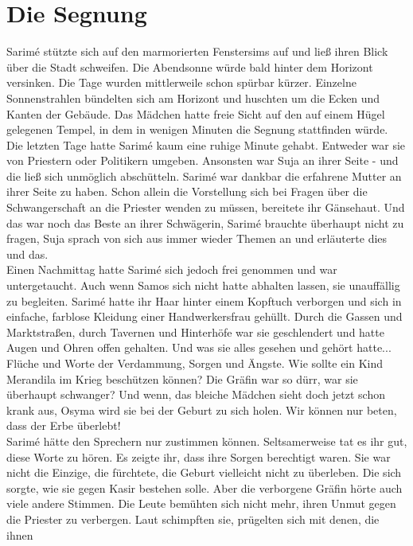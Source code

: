 \chapter{Die Segnung}

Sarimé stützte sich auf den marmorierten Fenstersims auf und ließ ihren Blick über die Stadt 
schweifen. Die Abendsonne würde bald hinter dem Horizont versinken. Die Tage wurden mittlerweile 
schon spürbar kürzer. Einzelne Sonnenstrahlen bündelten sich am Horizont und huschten um die Ecken 
und Kanten der Gebäude. Das Mädchen hatte freie Sicht auf den auf einem Hügel gelegenen Tempel, in 
dem in wenigen Minuten die Segnung stattfinden würde.\\
Die letzten Tage hatte Sarimé kaum eine ruhige Minute gehabt. Entweder war sie von Priestern oder 
Politikern umgeben. Ansonsten war Suja an ihrer Seite - und die ließ sich unmöglich abschütteln. 
Sarimé war dankbar die erfahrene Mutter an ihrer Seite zu haben. Schon allein die Vorstellung sich 
bei Fragen über die Schwangerschaft an die Priester wenden zu müssen, bereitete ihr Gänsehaut. Und 
das war noch das Beste an ihrer Schwägerin, Sarimé brauchte überhaupt nicht zu fragen, Suja sprach 
von sich aus immer wieder Themen an und erläuterte dies und das.\\
Einen Nachmittag hatte Sarimé sich jedoch frei genommen und war untergetaucht. Auch wenn Samos sich 
nicht hatte abhalten lassen, sie unauffällig zu begleiten. Sarimé hatte ihr Haar hinter einem 
Kopftuch verborgen und sich in einfache, farblose Kleidung einer Handwerkersfrau gehüllt. Durch die 
Gassen und Marktstraßen, durch Tavernen und Hinterhöfe war sie geschlendert und hatte Augen und 
Ohren offen gehalten. Und was sie alles gesehen und gehört hatte...\\
Flüche und Worte der Verdammung, Sorgen und Ängste. Wie sollte ein Kind Merandila im Krieg 
beschützen können? Die Gräfin war so dürr, war sie überhaupt schwanger? Und wenn, das bleiche 
Mädchen sieht doch jetzt schon krank aus, Osyma wird sie bei der Geburt zu sich holen. Wir können 
nur beten, dass der Erbe überlebt!\\
Sarimé hätte den Sprechern nur zustimmen können. Seltsamerweise tat es ihr gut, diese Worte zu 
hören. Es zeigte ihr, dass ihre Sorgen berechtigt waren. Sie war nicht die Einzige, die fürchtete, 
die Geburt vielleicht nicht zu überleben. Die sich sorgte, wie sie gegen Kasir bestehen solle. Aber 
die verborgene Gräfin hörte auch viele andere Stimmen. Die Leute bemühten sich nicht mehr, ihren 
Unmut gegen die Priester zu verbergen. Laut schimpften sie, prügelten sich mit denen, die ihnen 
